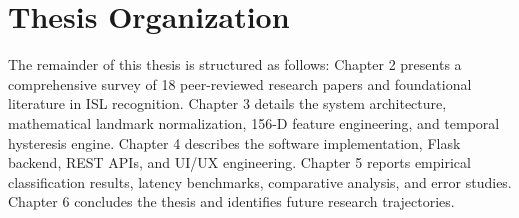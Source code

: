 \section{Thesis Organization}
The remainder of this thesis is structured as follows: Chapter 2 presents a comprehensive survey of 18 peer-reviewed research papers and foundational literature in ISL recognition. Chapter 3 details the system architecture, mathematical landmark normalization, 156-D feature engineering, and temporal hysteresis engine. Chapter 4 describes the software implementation, Flask backend, REST APIs, and UI/UX engineering. Chapter 5 reports empirical classification results, latency benchmarks, comparative analysis, and error studies. Chapter 6 concludes the thesis and identifies future research trajectories.

